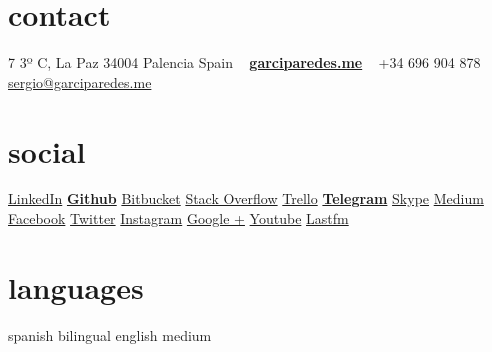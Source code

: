 \documentclass[]{friggeri-cv} %
\begin{document}


\begin{aside} %
\section{contact}
7 3º C, La Paz
34004 Palencia
Spain
~
\href{http://garciparedes.me}{\textbf{garciparedes.me}}
~
+34 696 904 878
\href{mailto:sergio@garciparedes.me}{sergio@garciparedes.me}
\section{social}
\href{https://es.linkedin.com/in/garciparedes/en}{LinkedIn\quad\faLinkedin }
\href{https://github.com/garciparedes}{\textbf{Github}\quad\faGithub }
\href{https://bitbucket.org/garciparedes/}{Bitbucket\quad\faBitbucket }
\href{http://stackoverflow.com/users/3921457/garciparedes}{Stack Overflow\quad\faStackOverflow }
\href{https://trello.com/garciparedes}{Trello\quad\faTrello }
\href{https://telegram.me/garciparedes}{\textbf{Telegram}\quad\faPaperPlane }
\href{skype:garciparedes?call}{Skype\quad\faSkype }
\href{https://medium.com/@garciparedes}{Medium\quad\faMedium }
\href{https://facebook.com/garciparedes}{Facebook\quad\faFacebook}
\href{https://twitter.com/garciparedes}{Twitter\quad\faTwitter }
\href{https://www.instagram.com/garciparedes/}{Instagram\quad\faInstagram }
\href{https://plus.google.com/+SergioGarcia-garciparedes/}{Google +\quad\faGooglePlus }
\href{https://www.youtube.com/user/GaRcYpArEdEs/}{Youtube\quad\faYoutubePlay }
\href{http://www.last.fm/user/garciparedes/}{Lastfm\quad\faLastfm}
\section{languages}
spanish bilingual
english medium
\begin{comment}
\section{programming}
Java\quad{\color{red} $\varheartsuit\varheartsuit\varheartsuit\varheartsuit\varheartsuit$}{\color{black} $\varheartsuit$}
Python\quad{\color{red} $\varheartsuit\varheartsuit\varheartsuit$}{\color{black} $\varheartsuit\varheartsuit\varheartsuit$}
JavaScript\quad{\color{red} $\varheartsuit\varheartsuit\varheartsuit\varheartsuit$}{\color{black} $\varheartsuit\varheartsuit$}
 C\quad{\color{red} $\varheartsuit\varheartsuit\varheartsuit\varheartsuit$}{\color{black} $\varheartsuit\varheartsuit$}
 C++\quad{\color{red} $\varheartsuit\varheartsuit\varheartsuit\varheartsuit$}{\color{black} $\varheartsuit\varheartsuit$}

\end{comment}
\end{aside}
\end{document}
